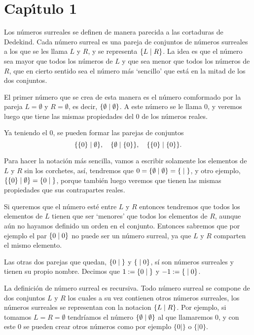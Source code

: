 \chapter{Cap\'{\i}tulo 1}

    Los números surreales se definen de manera parecida a las cortaduras de Dedekind. Cada n\'umero surreal es una pareja de conjuntos de n\'umeros surreales a los que se les llama $L$ y $R$, y se representa $\{L\;|\;R\}$. La idea es que el n\'umero sea mayor que todos los n\'umeros de $L$ y que sea menor que todos los n\'umeros de $R$, que en cierto sentido sea el n\'umero m\'as `sencillo' que est\'a en la mitad de los dos conjuntos.

    El primer n\'umero que se crea de esta manera es el n\'umero comformado por la pareja $L = \emptyset$ y $R=\emptyset$, es decir, $\{\emptyset\;|\;\emptyset\}$. A este n\'umero se le llama $0$, y veremos luego que tiene las mismas propiedades del $0$ de los n\'umeros reales.

    Ya teniendo el $0$, se pueden formar las parejas de conjuntos
    \[
        \{\{0\}\;|\;\emptyset\}, \quad \{\emptyset\;|\;\{0\}\}, \quad \{\{0\}\;|\;\{0\}\}.
    \]
    
    Para hacer la notaci\'on m\'as sencilla, vamos a escribir solamente los elementos de $L$ y $R$ sin los corchetes, as\'i, tendremos que $0=\{\emptyset\;|\;\emptyset\} = \{\;|\;\}$, y otro ejemplo, $\{\{0\}\;|\;\emptyset\} = \{0\;|\;\}$, porque tambi\'en luego veremos que tienen las mismas propiedades que sus contrapartes reales.

    Si queremos que el n\'umero est\'e entre $L$ y $R$ entonces tendremos que todos los elementos de $L$ tienen que ser `menores' que todos los elementos de $R$, aunque a\'un no hayamos definido un orden en el conjunto. Entonces sabremos que por ejemplo el par $\{0\;|\;0\}$ no puede ser un n\'umero surreal, ya que $L$ y $R$ comparten el mismo elemento.

    Las otras dos parejas que quedan, $\{0\;|\;\}$ y $\{\;|\;0\}$, s\'i son n\'umeros surreales y tienen su propio nombre. Decimos que $1 :=\{0\;|\;\}$ y $-1 :=\{\;|\;0\}$.

    La definición de número surreal es recursiva. Todo número surreal se compone de dos conjuntos $L$ y $R$ los cuales a su vez contienen otros números surreales, los números surreales se representan con la notacion $\{L\;|\;R\}$. Por ejemplo, si tomamos $L=R=\emptyset$ tendríamos el número $\{\emptyset\;|\;\emptyset\}$ al que llamaremos $0$, y con este $0$ se pueden crear otros números como por ejemplo $\{0|\}$ o $\{|0\}$.


